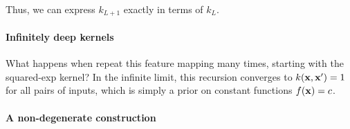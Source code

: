 \documentclass[twoside]{article}
\begin{document}
%
%
%
Thus, we can express $k_{L+1}$ exactly in terms of $k_L$.

\paragraph{Infinitely deep kernels}
What happens when repeat this feature mapping many times, starting with the squared-exp kernel?  In the infinite limit, this recursion converges to $k({\bf{x}},{\bf{x}}') = 1$ for all pairs of inputs, which is simply a prior on constant functions $f({\bf{x}}) = c$.

%

\paragraph{A non-degenerate construction}
\end{document}
